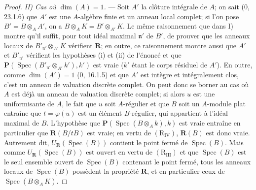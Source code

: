 \begin{proof}
\emph{II) Cas où $\dim(A)=1$.} --- Soit $A'$ la clôture intégrale de $A$;
on sait (0, 23.1.6) que $A'$ est une $A$-algèbre finie et un anneau local
complet; si l'on pose $B'=B\otimes_A A'$, on a
$B\otimes_A K=B'\otimes_{A'}K$. Le même raisonnement que dans I) montre
qu'il suffit, pour tout idéal maximal $\mathfrak n'$ de $B'$, de prouver que
les anneaux locaux de
$B'_{\mathfrak n'}\otimes_{A'}K$ vérifient $\boldsymbol R$; en outre, ce
raisonnement montre aussi que $A'$ et $B'_{\mathfrak n'}$ vérifient les
hypothèses (i) et (ii) de l'énoncé et que
$\boldsymbol P(\operatorname{Spec}(B'_{\mathfrak n'}\otimes_{A'}k'),k')$
est vraie ($k'$ étant le corps résiduel de $A'$). En outre, comme
$\dim(A')=1$ (0, 16.1.5) et que $A'$ est intègre et intégralement clos,
c'est un anneau de valuation discrète complet. On peut donc se borner au
cas où $A$ est déjà un anneau de valuation discrète complet; si alors $u$
est une uniformisante de $A$, le fait que $u$ soit $A$-régulier et que $B$
soit un $A$-module plat entraîne que $t=\varphi(u)$ est un élément
$B$-régulier, qui appartient à l'idéal maximal de $B$. L'hypothèse que
$\boldsymbol P(\operatorname{Spec}(B\otimes_A k),k)$ est vraie entraîne en
particulier que $\boldsymbol R(B/tB)$ est vraie; en vertu de
$(\mathrm R_{\mathrm{IV}})$, $\boldsymbol R(B)$ est donc vraie. Autrement
dit, $U_{\boldsymbol R}(\operatorname{Spec}(B))$ contient le point fermé de
$\operatorname{Spec}(B)$. Mais comme
$U_{\boldsymbol R}(\operatorname{Spec}(B))$ est ouvert en vertu de
$(\mathrm R_{\mathrm{III}})$ et que $\operatorname{Spec}(B)$ est le seul
ensemble ouvert de $\operatorname{Spec}(B)$ contenant le point fermé, tous
les anneaux locaux de $\operatorname{Spec}(B)$ possèdent la propriété
$\boldsymbol R$, et en particulier ceux de
$\operatorname{Spec}(B\otimes_A K)$.


\end{proof}
